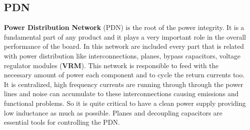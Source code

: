 \documentclass[12pt]{article}
\begin{document}

\subsection{PDN}

\textbf{Power Distribution Network} (PDN) is the root of the power integrity. It is a fundamental part of any product and it plays a very important role in the overall performance of the board. In this network are included every part that is related with power distribution like interconnections, planes, bypass capacitors, voltage regulator modules (\textbf{VRM}). This network is responsible to feed with the necessary amount of power each component and to cycle the return currents too. It is centralized, high frequency currents are running through through the power lines and noise can accumulate to these interconnections causing emissions and functional problems. So it is quite critical to have a clean power supply providing low inductance as much as possible. Planes and decoupling capacitors are essential tools for controlling the PDN.
\end{document}
